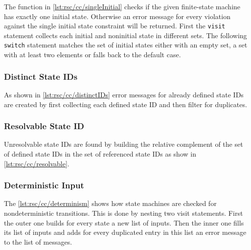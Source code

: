The function in \autoref{lst:rsc/cc/singleInitial} checks if the given finite-state machine has exactly one initial state.
Otherwise an error message for every violation against the single initial state constraint will be returned.
First the \lstinline[language=rascal]{visit} statement collects each initial and noninitial state in different sets.
The following \lstinline[language=rascal]{switch} statement matches the set of initial states either with an empty set, a set with at least two elements or falls back to the default case.



\subsubsection{Distinct State IDs}

As shown in \autoref{lst:rsc/cc/distinctIDs} error messages for already defined state IDs are created by first collecting each defined state ID and then filter for duplicates.



\subsubsection{Resolvable State ID}

Unresolvable state IDs are found by building the relative complement of the set of defined state IDs in the set of referenced state IDs as show in \autoref{lst:rsc/cc/resolvable}.



\subsubsection{Deterministic Input}

The \autoref{lst:rsc/cc/determinism} shows how state machines are checked for nondeterministic transitions.
This is done by nesting two visit statements.
First the outer one builds for every state a new list of inputs.
Then the inner one fills its list of inputs and adds for every duplicated entry in this list an error message to the list of messages.

